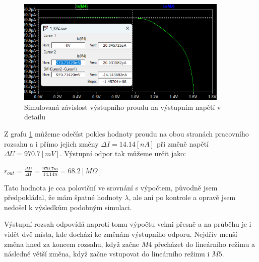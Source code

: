 \begin{figure}[h!]
    \centering
    \includegraphics[width=0.9\textwidth]{text/img/KPZ-dc-graf-detail.png}
    \caption{\label{fig:KPZ-dc-graf-detail} Simulovaná závislost výstupního proudu na výstupním napětí v detailu}
\end{figure}

Z grafu \ref{fig:KPZ-dc-graf-detail} můžeme odečíst pokles hodnoty proudu na obou stranách pracovního rozsahu a i přímo jejich změny \(\Delta I = 14.14 [nA]\) při změně napětí \(\Delta U = 970.7 [mV]\).
Výstupní odpor tak můžeme určit jako:

\begin{center}
    \large
    \(
        r_{out} = \frac{\Delta U}{\Delta I} = \frac{970.7m}{14.14n} = 68.2 [M\Omega] 
    \)
\end{center}

Tato hodnota je cca poloviční ve srovnání s výpočtem, původně jsem předpokládal, že mám špatné hodnoty \(\lambda\), ale ani po kontrole a opravě jsem nedošel k výsledkům podobným simulaci.

Výstupní rozsah odpovídá naproti tomu výpočtu velmi přesně a na průběhu je i vidět dvě místa, kde dochází ke změnám výstupního odporu.
Nejdřív menší změna hned za koncem rozsahu, když začne \(M4\) přecházet do lineárního režimu a následně větší změna, když začne vstupovat do lineárního režimu i \(M5\).